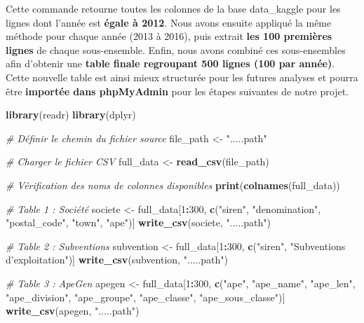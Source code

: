 \documentclass[mstat,12pt]{unswthesis}
\newenvironment{Shaded}{\begin{snugshade}}{\end{snugshade}}
\newcommand{\CommentTok}[1]{\textcolor[rgb]{0.56,0.35,0.01}{\textit{#1}}}
\newcommand{\DecValTok}[1]{\textcolor[rgb]{0.00,0.00,0.81}{#1}}
\newcommand{\FunctionTok}[1]{\textcolor[rgb]{0.13,0.29,0.53}{\textbf{#1}}}
\newcommand{\NormalTok}[1]{#1}
\newcommand{\OtherTok}[1]{\textcolor[rgb]{0.56,0.35,0.01}{#1}}
\newcommand{\SpecialCharTok}[1]{\textcolor[rgb]{0.81,0.36,0.00}{\textbf{#1}}}
\newcommand{\StringTok}[1]{\textcolor[rgb]{0.31,0.60,0.02}{#1}}
\begin{document}
\normalsize

\medskip

Cette commande retourne toutes les colonnes de la base data\_kaggle pour
les lignes dont l'année est \textbf{égale à 2012}. Nous avons ensuite
appliqué la même méthode pour chaque année (2013 à 2016), puis extrait
\textbf{les 100 premières lignes} de chaque sous-ensemble. Enfin, nous
avons combiné ces sous-ensembles afin d'obtenir une \textbf{table finale
regroupant 500 lignes (100 par année)}. Cette nouvelle table est ainsi
mieux structurée pour les futures analyses et pourra être
\textbf{importée dans phpMyAdmin} pour les étapes suivantes de notre
projet.

\newpage

\tiny

\begin{Shaded}
\begin{Highlighting}[]
\FunctionTok{library}\NormalTok{(readr)}
\FunctionTok{library}\NormalTok{(dplyr)}

\CommentTok{\# Définir le chemin du fichier source}
\NormalTok{file\_path }\OtherTok{\textless{}{-}} \StringTok{".....path"}

\CommentTok{\# Charger le fichier CSV}
\NormalTok{full\_data }\OtherTok{\textless{}{-}} \FunctionTok{read\_csv}\NormalTok{(file\_path)}

\CommentTok{\# Vérification des noms de colonnes disponibles}
\FunctionTok{print}\NormalTok{(}\FunctionTok{colnames}\NormalTok{(full\_data))}

\CommentTok{\# Table 1 : Société}
\NormalTok{societe }\OtherTok{\textless{}{-}}\NormalTok{ full\_data[}\DecValTok{1}\SpecialCharTok{:}\DecValTok{300}\NormalTok{, }\FunctionTok{c}\NormalTok{(}\StringTok{"siren"}\NormalTok{, }\StringTok{"denomination"}\NormalTok{, }\StringTok{"postal\_code"}\NormalTok{, }\StringTok{"town"}\NormalTok{, }\StringTok{"ape"}\NormalTok{)]}
\FunctionTok{write\_csv}\NormalTok{(societe, }\StringTok{".....path"}\NormalTok{)}

\CommentTok{\# Table 2 : Subventions}
\NormalTok{subvention }\OtherTok{\textless{}{-}}\NormalTok{ full\_data[}\DecValTok{1}\SpecialCharTok{:}\DecValTok{300}\NormalTok{, }\FunctionTok{c}\NormalTok{(}\StringTok{"siren"}\NormalTok{, }\StringTok{"Subventions d’exploitation"}\NormalTok{)]}
\FunctionTok{write\_csv}\NormalTok{(subvention, }\StringTok{".....path"}\NormalTok{)}

\CommentTok{\# Table 3 : ApeGen}
\NormalTok{apegen }\OtherTok{\textless{}{-}}\NormalTok{ full\_data[}\DecValTok{1}\SpecialCharTok{:}\DecValTok{300}\NormalTok{, }\FunctionTok{c}\NormalTok{(}\StringTok{"ape"}\NormalTok{, }\StringTok{"ape\_name"}\NormalTok{, }\StringTok{"ape\_len"}\NormalTok{, }\StringTok{"ape\_division"}\NormalTok{, }\StringTok{"ape\_groupe"}\NormalTok{, }\StringTok{"ape\_classe"}\NormalTok{, }\StringTok{"ape\_sous\_classe"}\NormalTok{)]}
\FunctionTok{write\_csv}\NormalTok{(apegen, }\StringTok{".....path"}\NormalTok{)}


\end{Highlighting}
\end{Shaded}
\end{document}
